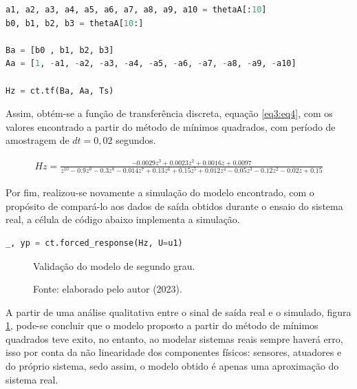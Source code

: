 \begin{lstlisting}[language=python]
a1, a2, a3, a4, a5, a6, a7, a8, a9, a10 = thetaA[:10]
b0, b1, b2, b3 = thetaA[10:]

Ba = [b0 , b1, b2, b3]
Aa = [1, -a1, -a2, -a3, -a4, -a5, -a6, -a7, -a8, -a9, -a10]

Hz = ct.tf(Ba, Aa, Ts)
\end{lstlisting}

Assim, obtém-se a função de transferência discreta, equação \ref{eq3:eq4}, com os valores encontrado a partir do método de mínimos quadrados, com período de amostragem de $dt = 0,02$ segundos.

\begin{align}
Hz = \frac{-0.0029 z^3 + 0.0023z^2 + 0.0016 z + 0.0097}{z^{10} - 0.9 z^9 - 0.3 z^8 - 0.014 z^7 + 0.13 z^6 + 0.15 z^5 + 0.012 z^4 - 0.05 z^3 - 0.12 z^2 - 0.02 z + 0.15} \label{eq3:eq4}
\end{align}

Por fim, realizou-se novamente a simulação do modelo encontrado, com o propósito de compará-lo aos dados de saída obtidos durante o ensaio do sistema real, a célula de código abaixo implementa a simulação.

\vspace{0.5cm}

\begin{lstlisting}[language=python]
_, yp = ct.forced_response(Hz, U=u1)
\end{lstlisting}


\begin{figure}[!h]
	\centering
	\caption{Validação do modelo de segundo grau.}
	\caption*{Fonte: elaborado pelo autor (2023).}
	\label{fig3:image_22}
\end{figure}


A partir de uma análise qualitativa entre o sinal de saída real e o simulado, figura \ref{fig3:image_22}, pode-se concluir que o modelo proposto a partir do método de mínimos quadrados teve exito, no entanto, ao modelar sistemas reais sempre haverá erro, isso por conta da não linearidade dos componentes físicos: sensores, atuadores e do próprio sistema, sedo assim, o modelo obtido é apenas uma aproximação do sistema real. %


